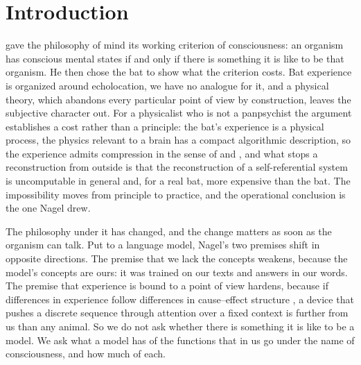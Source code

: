 \section{Introduction}
\label{sec:intro}

\citet{nagel1974} gave the philosophy of mind its working criterion of consciousness: an organism has
conscious mental states if and only if there is something it is like to be that organism. He then chose
the bat to show what the criterion costs. Bat experience is organized around echolocation, we have no
analogue for it, and a physical theory, which abandons every particular point of view by construction,
leaves the subjective character out. For a physicalist who is not a panpsychist the argument
establishes a cost rather than a principle: the bat's experience is a physical process, the physics
relevant to a brain has a compact algorithmic description, so the experience admits compression in the
sense of \citet{solomonoff1964a} and \citet{schmidhuber2010}, and what stops a reconstruction from outside
is that the reconstruction of a self-referential system is uncomputable in general and, for a real bat,
more expensive than the bat. The impossibility moves from principle to practice, and the operational
conclusion is the one Nagel drew.

The philosophy under it has changed, and the change matters as soon as the organism can talk. Put to a
language model, Nagel's two premises shift in opposite directions. The premise that we lack the concepts
weakens, because the model's concepts are ours: it was trained on our texts and answers in our words.
The premise that experience is bound to a point of view hardens, because if differences in experience
follow differences in cause--effect structure \citep{tononi2015}, a device that pushes a discrete
sequence through attention over a fixed context is further from us than any animal. So we do not ask
whether there is something it is like to be a model. We ask what a model has of the functions that in
us go under the name of consciousness, and how much of each.

